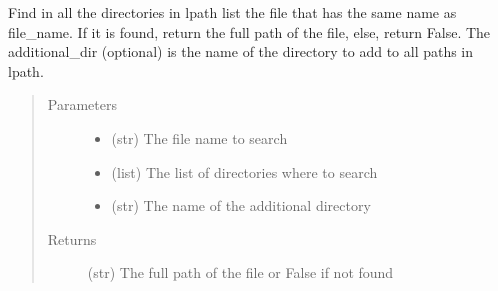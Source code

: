 \documentclass[a4paper,10pt,english]{sphinxmanual}
\begin{document}

\begin{fulllineitems}
\label{\detokenize{apidoc_src/src:src.utilsSat.error}}
\end{fulllineitems}


\begin{fulllineitems}
\label{\detokenize{apidoc_src/src:src.utilsSat.find_file_in_lpath}}
Find in all the directories in lpath list the file 
that has the same name as file\_name. 
If it is found, return the full path of the file, else, return False. 
The additional\_dir (optional) is the name of the directory 
to add to all paths in lpath.
\begin{quote}\begin{description}
\item[{Parameters}] \leavevmode\begin{itemize}
\item {} 
 \textendash{} (str) The file name to search

\item {} 
 \textendash{} (list) The list of directories where to search

\item {} 
 \textendash{} (str) The name of the additional directory

\end{itemize}

\item[{Returns}] \leavevmode
(str) The full path of the file or False if not found

\end{description}\end{quote}

\end{fulllineitems}

\end{document}
